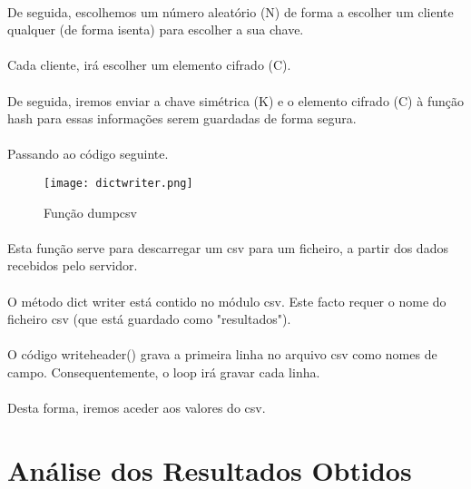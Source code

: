 \documentclass[a4paper,11pt,onecolumn,oneside]{article}
\begin{document}
\paragraph{ }
De seguida, escolhemos um número aleatório (N) de forma a escolher um cliente qualquer (de forma isenta) para escolher a sua chave.
\paragraph{ }
Cada cliente, irá escolher um elemento cifrado (C).
\paragraph{ }
De seguida, iremos enviar a chave simétrica (K) e o elemento cifrado (C) à função hash para essas informações serem guardadas de forma segura.
\paragraph{ }
Passando ao código seguinte.


\begin{figure} [h]
\center
\texttt{[image: dictwriter.png]}
\caption{Função dump\textunderscore csv}
\label{dump}
\end{figure}

\paragraph{ }
Esta função serve para descarregar um csv para um ficheiro, a partir dos dados recebidos pelo servidor.
\paragraph{ }
O método dict writer está contido no módulo csv. Este facto requer o nome do ficheiro csv (que está guardado como "resultados").
\paragraph{ }
O código writeheader() grava a primeira linha no arquivo csv como nomes de campo. Consequentemente, o loop irá gravar cada linha.
\paragraph{ }
Desta forma, iremos aceder aos valores do csv.

\newpage
{\center \section{Análise dos Resultados Obtidos}}
\end{document}
